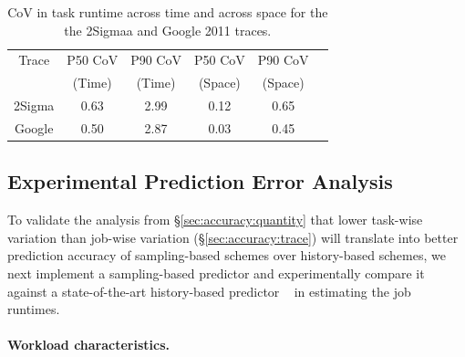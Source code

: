 \begin{table}[tp]
  \caption{CoV in task runtime across time and across space for the
	the 2Sigmaa and Google 2011 traces.}
\label{table:accuracy:trace_analysis:covs}
\centering
{\small
\vspace{-0.1in}
\begin{tabular}{|c|c|c|c|c|c|}
\hline
                 Trace       & P50 CoV & P90 CoV & P50 CoV & P90 CoV \\
			& (Time)  & (Time)& (Space) & (Space) \\
\hline
	2Sigma & 0.63 & 2.99 & 0.12 & 0.65 \\
\hline
	Google & 0.50 & 2.87 & 0.03 & 0.45 \\
\hline
\end{tabular}
}
\vspace{-0.1in}
\end{table}

\subsection{Experimental Prediction Error Analysis}
\label{sec:accuracy:experiment}

To validate the analysis from \S\ref{sec:accuracy:quantity} 
that lower task-wise variation than job-wise
variation (\S\ref{sec:accuracy:trace}) will translate into better
prediction accuracy of sampling-based schemes over history-based
schemes, we next implement a sampling-based predictor \slearn and
experimentally compare it against a state-of-the-art history-based
predictor \primarybasepredict~\cite{3Sigma} in estimating the job
runtimes.

\paragraph{Workload characteristics.}

